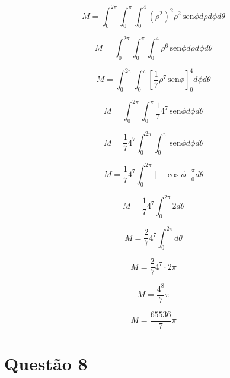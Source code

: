 \documentclass[10pt,a4paper]{article}
\newcommand{\sen}{\hspace{2pt}\textrm{sen}}
\begin{document}
	\begin{equation*}
		M = \int_{0}^{2\pi} \int_{0}^{\pi} \int_{0}^{4} (\rho^2)^2 \rho^2 \sen \phi d\rho d\phi d\theta
	\end{equation*}
	
	\begin{equation*}
		M = \int_{0}^{2\pi} \int_{0}^{\pi} \int_{0}^{4} \rho^6 \sen \phi d\rho d\phi d\theta
	\end{equation*}
	
	\begin{equation*}
		M = \int_{0}^{2\pi} \int_{0}^{\pi} \left[ \frac{1}{7}\rho^7 \sen \phi \right]_{0}^{4} d\phi d\theta
	\end{equation*}
	
	\begin{equation*}
		M = \int_{0}^{2\pi} \int_{0}^{\pi} \frac{1}{7}4^7 \sen \phi  d\phi d\theta
	\end{equation*}
	
	\begin{equation*}
		M = \frac{1}{7}4^7 \int_{0}^{2\pi} \int_{0}^{\pi} \sen \phi  d\phi d\theta
	\end{equation*}
	
	\begin{equation*}
		M = \frac{1}{7}4^7 \int_{0}^{2\pi} \left[-\cos \phi\right]_0^{\pi}  d\theta
	\end{equation*}
	
	\begin{equation*}
		M = \frac{1}{7}4^7 \int_{0}^{2\pi} 2 d\theta
	\end{equation*}
	
	\begin{equation*}
		M = \frac{2}{7}4^7 \int_{0}^{2\pi} d\theta
	\end{equation*}
	
	\begin{equation*}
		M = \frac{2}{7}4^7 \cdot 2\pi
	\end{equation*}
	
	\begin{equation*}
		M = \frac{4^8}{7}\pi
	\end{equation*}
	
	\begin{equation*}
		M = \frac{65536}{7}\pi
	\end{equation*}
	
	\section*{Questão 8}
	
\end{document}
